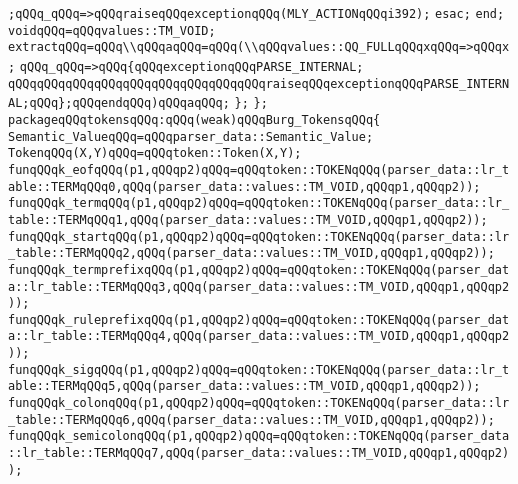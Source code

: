 \verb|;qQQq_qQQq=>qQQqraiseqQQqexceptionqQQq(MLY_ACTIONqQQqi392);|\newline
\verb|esac;|\newline
\verb|end;|\newline
\verb|voidqQQq=qQQqvalues::TM_VOID;|\newline
\verb|extractqQQq=qQQq\\qQQqaqQQq=qQQq(\\qQQqvalues::QQ_FULLqQQqxqQQq=>qQQqx;|\newline
\verb|qQQq_qQQq=>qQQq{qQQqexceptionqQQqPARSE_INTERNAL;|\newline
\verb|qQQqqQQqqQQqqQQqqQQqqQQqqQQqqQQqqQQqraiseqQQqexceptionqQQqPARSE_INTERNAL;qQQq};qQQqendqQQq)qQQqaqQQq;|\newline
\verb|};|\newline
\verb|};|\newline
\verb|packageqQQqtokensqQQq:qQQq(weak)qQQqBurg_TokensqQQq{|\newline
\verb|Semantic_ValueqQQq=qQQqparser_data::Semantic_Value;|\newline
\verb|TokenqQQq(X,Y)qQQq=qQQqtoken::Token(X,Y);|\newline
\verb|funqQQqk_eofqQQq(p1,qQQqp2)qQQq=qQQqtoken::TOKENqQQq(parser_data::lr_table::TERMqQQq0,qQQq(parser_data::values::TM_VOID,qQQqp1,qQQqp2));|\newline
\verb|funqQQqk_termqQQq(p1,qQQqp2)qQQq=qQQqtoken::TOKENqQQq(parser_data::lr_table::TERMqQQq1,qQQq(parser_data::values::TM_VOID,qQQqp1,qQQqp2));|\newline
\verb|funqQQqk_startqQQq(p1,qQQqp2)qQQq=qQQqtoken::TOKENqQQq(parser_data::lr_table::TERMqQQq2,qQQq(parser_data::values::TM_VOID,qQQqp1,qQQqp2));|\newline
\verb|funqQQqk_termprefixqQQq(p1,qQQqp2)qQQq=qQQqtoken::TOKENqQQq(parser_data::lr_table::TERMqQQq3,qQQq(parser_data::values::TM_VOID,qQQqp1,qQQqp2));|\newline
\verb|funqQQqk_ruleprefixqQQq(p1,qQQqp2)qQQq=qQQqtoken::TOKENqQQq(parser_data::lr_table::TERMqQQq4,qQQq(parser_data::values::TM_VOID,qQQqp1,qQQqp2));|\newline
\verb|funqQQqk_sigqQQq(p1,qQQqp2)qQQq=qQQqtoken::TOKENqQQq(parser_data::lr_table::TERMqQQq5,qQQq(parser_data::values::TM_VOID,qQQqp1,qQQqp2));|\newline
\verb|funqQQqk_colonqQQq(p1,qQQqp2)qQQq=qQQqtoken::TOKENqQQq(parser_data::lr_table::TERMqQQq6,qQQq(parser_data::values::TM_VOID,qQQqp1,qQQqp2));|\newline
\verb|funqQQqk_semicolonqQQq(p1,qQQqp2)qQQq=qQQqtoken::TOKENqQQq(parser_data::lr_table::TERMqQQq7,qQQq(parser_data::values::TM_VOID,qQQqp1,qQQqp2));|\newline
